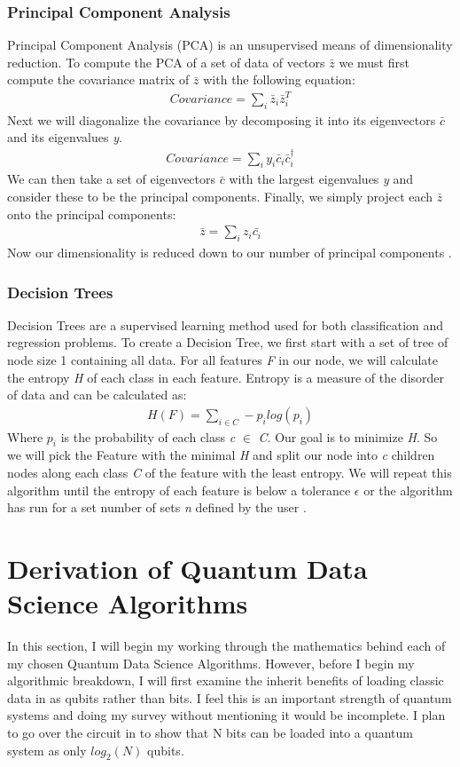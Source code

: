 \documentclass[conference]{IEEEtran}
\begin{document}
\subsubsection{Principal Component Analysis}
Principal Component Analysis (PCA) is an unsupervised means of dimensionality reduction. To compute the PCA of a set of data of vectors $\bar{z}$ we must first compute the covariance matrix of $\bar{z}$ with the following equation:
\begin{align*}
Covariance = \sum_i \bar{z}_i\bar{z}^T_i
\end{align*}
\indent Next we will diagonalize the covariance by decomposing it into its eigenvectors \emph{$\bar{c}$} and its eigenvalues \emph{{y}}.
\begin{align*}
Covariance = \sum_i y_i\bar{c}_i\bar{c}_i^\dagger
\end{align*}
\indent We can then take a set of eigenvectors \emph{$\bar{c}$} with the largest eigenvalues \emph{{y}} and consider these to be the principal components. Finally, we simply project each $\bar{z}$ onto the principal components: 
\begin{align*}
    \bar{z} = \sum_i z_i \bar{c_i}
\end{align*}
Now our dimensionality is reduced down to our number of principal components \cite{b7}. 
\subsubsection{Decision Trees}
Decision Trees are a supervised learning method used for both classification and regression problems. To create a Decision Tree, we first start with a set of tree of node size 1 containing all data. For all features \emph{F} in our node, we will calculate the entropy \emph{H} of each class  in each feature. Entropy is a measure of the disorder of data and can be calculated as:
\begin{align*}
    H(F) = \sum_{i\in C} -p_i log(p_i)
\end{align*}
Where \emph{$p_i$} is the probability of each class \emph{c} $\in$ \emph{C}. Our goal is to minimize \emph{H}. So we will pick the Feature with the minimal \emph{H} and split our node into \emph{c} children nodes along each class \emph{C} of the feature with the least entropy. We will repeat this algorithm until the entropy of each feature is below a tolerance $\epsilon$ or the algorithm has run for a set number of sets \emph{n} defined by the user \cite{b11}. 

\section{Derivation of Quantum Data Science Algorithms}
In this section, I will begin my working through the mathematics behind each of my chosen Quantum Data Science Algorithms. However, before I begin my algorithmic breakdown, I will first examine the inherit benefits of loading classic data in as qubits rather than bits. I feel this is an important strength of quantum systems and doing my survey without mentioning it would be incomplete. I plan to go over the circuit in \cite{b12} to show that N bits can be loaded into a quantum system as only $log_2(N)$ qubits.   
\end{document}

